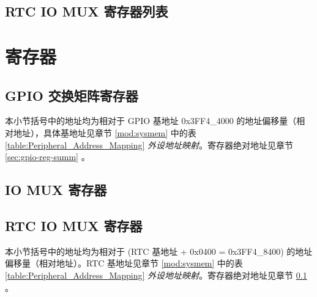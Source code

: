 \documentclass[main\_\_CN.tex]{subfiles}
\begin{document}
\subsection{RTC IO MUX 寄存器列表}\label{sec:rtcio-reg-summ}


\section{寄存器}
\label{section:4.13}
\subsection{GPIO 交换矩阵寄存器}
本小节括号中的地址均为相对于 GPIO 基地址 0x3FF4\_4000 的地址偏移量（相对地址），具体基地址见章节 \ref{mod:sysmem} \textit{} 中的表 \ref{table:Peripheral_Address_Mapping} \textit{外设地址映射}。寄存器绝对地址见章节 \ref{sec:gpio-reg-summ} \textit{}。


\subsection{IO MUX 寄存器}

\clearpage


\subsection{RTC IO MUX 寄存器}

本小节括号中的地址均为相对于 (RTC 基地址 + 0x0400 = 0x3FF4\_8400) 的地址偏移量（相对地址）。RTC 基地址见章节 \ref{mod:sysmem} \textit{} 中的表 \ref{table:Peripheral_Address_Mapping} \textit{外设地址映射}。寄存器绝对地址见章节 \ref{sec:rtcio-reg-summ} \textit{}。


\end{document}
